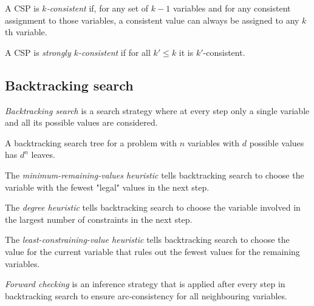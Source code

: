 \documentclass{article}
\begin{document}
\begin{definition}
    A CSP is \emph{$k$-consistent} if, for any set of $k-1$ variables and for any consistent 
    assignment to those variables, a consistent value can always be assigned to any
    $k$th variable.
\end{definition}

\begin{definition}
    A CSP is \emph{strongly $k$-consistent} if for all $k'\leq k$ it is $k'$-consistent.
\end{definition}

\subsection{Backtracking search}

\begin{definition}
    \emph{Backtracking search} is a search strategy where at every step only a single
    variable and all its possible values are considered.
\end{definition}

\begin{lemma}
    A backtracking search tree for a problem with $n$ variables with $d$ possible values
    has $d^n$ leaves.
\end{lemma}

\begin{definition}
    The \emph{minimum-remaining-values heuristic} tells backtracking search to choose
    the variable with the fewest "legal" values in the next step.
\end{definition}

\begin{definition}
    The \emph{degree heuristic} tells backtracking search to choose the variable
    involved in the largest number of constraints in the next step.
\end{definition}

\begin{definition}
    The \emph{least-constraining-value heuristic} tells backtracking search to
    choose the value for the current variable that rules out the fewest values
    for the remaining variables.
\end{definition}

\begin{definition}
    \emph{Forward checking} is an inference strategy that is applied after every
    step in backtracking search to ensure arc-consistency for all neighbouring variables.
\end{definition}
\end{document}
